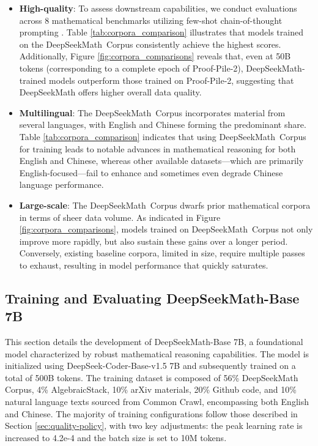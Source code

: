 \begin{itemize}[topsep=0pt]
    \item \textbf{High-quality}:
    To assess downstream capabilities, we conduct evaluations across 8 mathematical benchmarks utilizing few-shot chain-of-thought prompting \cite{cot}. Table \ref{tab:corpora_comparison} illustrates that models trained on the DeepSeekMath~Corpus consistently achieve the highest scores. Additionally, Figure \ref{fig:corpora_comparisons} reveals that, even at 50B tokens (corresponding to a complete epoch of Proof-Pile-2), DeepSeekMath-trained models outperform those trained on Proof-Pile-2, suggesting that DeepSeekMath offers higher overall data quality. 
    \item \textbf{Multilingual}:
    The DeepSeekMath~Corpus incorporates material from several languages, with English and Chinese forming the predominant share. Table \ref{tab:corpora_comparison} indicates that using DeepSeekMath~Corpus for training leads to notable advances in mathematical reasoning for both English and Chinese, whereas other available datasets—which are primarily English-focused—fail to enhance and sometimes even degrade Chinese language performance.
    \item \textbf{Large-scale}:
    The DeepSeekMath~Corpus dwarfs prior mathematical corpora in terms of sheer data volume. As indicated in Figure \ref{fig:corpora_comparisons}, models trained on DeepSeekMath~Corpus not only improve more rapidly, but also sustain these gains over a longer period. Conversely, existing baseline corpora, limited in size, require multiple passes to exhaust, resulting in model performance that quickly saturates.
\end{itemize}

\subsection{Training and Evaluating DeepSeekMath-Base 7B}

This section details the development of DeepSeekMath-Base 7B, a foundational model characterized by robust mathematical reasoning capabilities. The model is initialized using DeepSeek-Coder-Base-v1.5 7B \citep{deepseek-coder} and subsequently trained on a total of 500B tokens. The training dataset is composed of 56\% DeepSeekMath Corpus, 4\% AlgebraicStack, 10\% arXiv materials, 20\% Github code, and 10\% natural language texts sourced from Common Crawl, encompassing both English and Chinese. The majority of training configurations follow those described in Section \ref{sec:quality-policy}, with two key adjustments: the peak learning rate is increased to 4.2e-4 and the batch size is set to 10M tokens.

